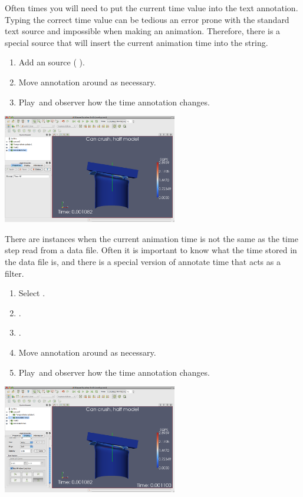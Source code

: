 Often times you will need to put the current time value into the text
annotation.  Typing the correct time value can be tedious an error prone
with the standard text source and impossible when making an animation.
Therefore, there is a special  source that will
insert the current animation time into the string.

\begin{enumerate}
\item Add an  source ( \ra {}).
\item Move annotation around as necessary.
\item Play~\vcrPlay and observer how the time annotation changes.
  \savecounter
\end{enumerate}

\begin{inlinefig}
  \includegraphics[width=3in]{images/AnnotateTimeSource}
\end{inlinefig}

There are instances when the current animation time is not the same as the
time step read from a data file.  Often it is important to know what the
time stored in the data file is, and there is a special version of annotate
time that acts as a filter.

\begin{enumerate}
  \restorecounter
\item Select .
\item {} \ra {} \ra {}. 
\item \apply.
\item Move annotation around as necessary.
\item Play~\vcrPlay and observer how the time annotation changes.
\end{enumerate}

\begin{inlinefig}
  \includegraphics[width=3in]{images/AnnotateTimeFilter}
\end{inlinefig}


